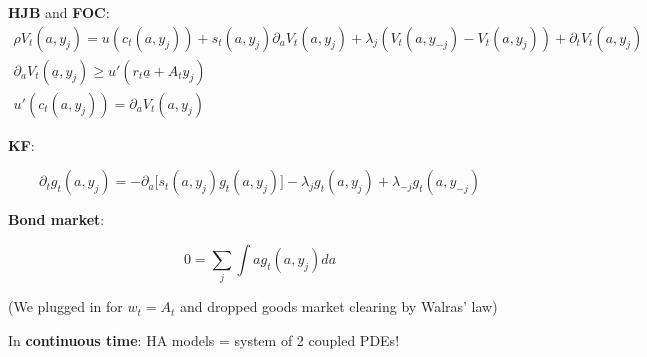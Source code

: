 \documentclass[11pt, aspectratio=169]{beamer}
\begin{document}
\begin{frame}{}

\vspace{4mm}
\textbf{HJB} and \textbf{FOC}:
\begin{gather*}
	\rho V_t(a, y_j) = u(c_t(a, y_j)) + s_t(a, y_j) \partial_a V_t(a, y_j) + \lambda_j(V_t(a, y_{-j}) - V_t(a, y_j)) + \partial_t V_t(a, y_j) \\[6pt]
	\partial_a V_t(\underline a, y_j) \geq u'(r_t \underline a + A_t y_j)  \\[6pt]
	u'(c_t(a, y_j)) = \partial_a V_t(a, y_j)
\end{gather*}

\vspace{4mm}
\textbf{KF}:

\vspace{-10mm}
\begin{equation*}
	\partial_t g_t(a, y_j) = -\partial_a \Big[ s_t(a, y_j) g_t(a, y_j) \Big] - \lambda_j g_t(a, y_j) + \lambda_{-j} g_t(a, y_{-j}) 
\end{equation*}

\vspace{4mm}
\textbf{Bond market}:

\vspace{-10mm}
\begin{equation*}
	0 = \sum_j \int a g_t(a, y_j) da
\end{equation*}

\vspace{4mm}
(We plugged in for $w_t = A_t$ and dropped goods market clearing by Walras' law)

\vspace{4mm}
In {\color{blue}\textbf{continuous time}}: HA models = system of 2 coupled PDEs!

\end{frame}
\end{document}
